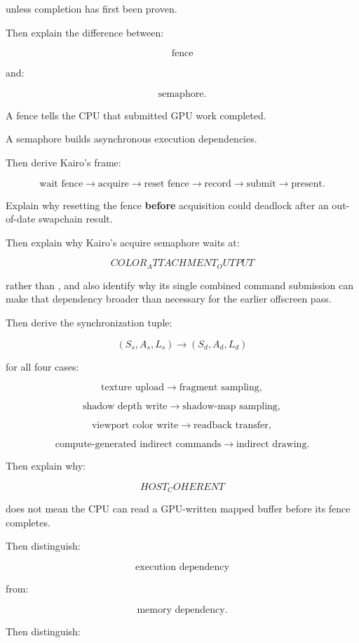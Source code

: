unless completion has first been proven.

Then explain the difference between:

\[
\boxed{\text{fence}}
\]

and:

\[
\boxed{\text{semaphore}}.
\]

A fence tells the CPU that submitted GPU work completed.

A semaphore builds asynchronous execution dependencies.

Then derive Kairo's frame:

\[
\text{wait fence}
\rightarrow
\text{acquire}
\rightarrow
\text{reset fence}
\rightarrow
\text{record}
\rightarrow
\text{submit}
\rightarrow
\text{present}.
\]

Explain why resetting the fence \textbf{before} acquisition could deadlock after an out-of-date swapchain result.

Then explain why Kairo's acquire semaphore waits at:

\[
COLOR_ATTACHMENT_OUTPUT
\]

rather than , and also identify why its single combined command submission can make that dependency broader than necessary for the earlier offscreen pass.

Then derive the synchronization tuple:

\[
\boxed{
(S_s,A_s,L_s)
\rightarrow
(S_d,A_d,L_d)
}
\]

for all four cases:

\[
\text{texture upload}
\rightarrow
\text{fragment sampling},
\]

\[
\text{shadow depth write}
\rightarrow
\text{shadow-map sampling},
\]

\[
\text{viewport color write}
\rightarrow
\text{readback transfer},
\]

\[
\text{compute-generated indirect commands}
\rightarrow
\text{indirect drawing}.
\]

Then explain why:

\[
HOST_COHERENT
\]

does not mean the CPU can read a GPU-written mapped buffer before its fence completes.

Then distinguish:

\[
\text{execution dependency}
\]

from:

\[
\text{memory dependency}.
\]

Then distinguish:

